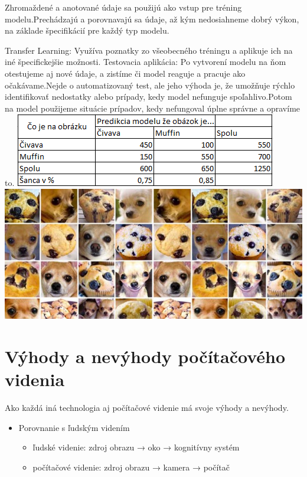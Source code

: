 \documentclass[10pt,twoside,slovak,a4paper]{article}
\begin{document}
Zhromaždené a anotované údaje sa použijú ako vstup pre tréning modelu.Prechádzajú a porovnavajú sa údaje, až kým nedosiahneme dobrý výkon, na základe špecifikácií pre každý typ modelu.


Transfer Learning: Využíva poznatky zo všeobecného tréningu a aplikuje ich na iné špecifickejšie možnosti.
Testovacia aplikácia: Po vytvorení modelu na ňom otestujeme aj nové údaje, a zistíme či model reaguje a pracuje ako očakávame.Nejde o automatizovaný test, ale jeho výhoda je, že umožňuje rýchlo identifikovať nedostatky alebo prípady, kedy model nefunguje spoľahlivo.Potom na model použijeme situácie prípadov, kedy nefungoval úplne správne a opravíme to.\cite{CV-framework}
\includegraphics[scale=1]{tabulka.png}
\includegraphics[scale=0.5]{civava_vs_muffin.jpeg}
\cite{Conditional-Probability}

\centering



\section{Výhody a nevýhody počítačového videnia} \label{ina}
Ako každá iná technologia aj počítačové videnie má svoje výhody a nevýhody.
\begin{itemize}
\item Porovnanie s ľudským videním
	\begin{itemize}
	\item ľudské videnie: zdroj obrazu → oko → kognitívny systém
	\item počítačové videnie: zdroj obrazu → kamera → počítač
	\cite{CV-TUKE}
	\end{itemize}
\end{itemize}
\end{document}
